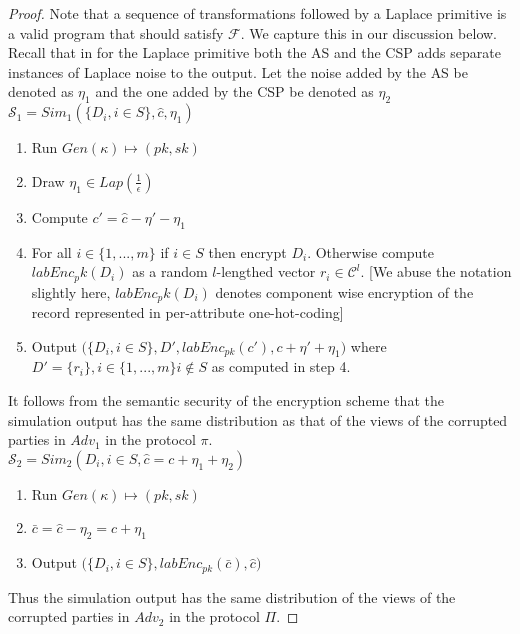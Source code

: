 \begin{proof}
  Note that a sequence of transformations followed by a \textsf{Laplace} primitive is a valid \system program that should satisfy $\mathcal{F}$. We capture this in our discussion below. Recall that in \system for the \textsf{Laplace} primitive both the \textsf{AS} and the \textsf{CSP} adds separate instances of Laplace noise to the output. Let the noise added by the \textsf{AS}  be denoted as $\eta_1$ and the one added by the \textsf{CSP} be denoted as $\eta_2$\\
$\mathcal{S}_1=Sim_1(\{D_i, i \in S\}, \hat{c}, \eta_1)$
\begin{enumerate}\item Run $Gen(\kappa)\mapsto (pk,sk)$ 
\item Draw $\eta_1 \in Lap(\frac{1}{\epsilon})$
\item Compute $c'=\hat{c}-\eta'-\eta_1$
\item For all $i \in \{1,...,m\}$ if $i \in S$ then encrypt $D_i$. 
Otherwise compute $labEnc_pk(D_i)$ as a random $l$-lengthed vector $r_i \in \mathcal{C}^l$. [We abuse the notation slightly here, $labEnc_pk(D_i)$ denotes component wise encryption of the record represented in per-attribute one-hot-coding]
\item Output $\Big(\{D_i, i \in S\},D',labEnc_{pk}(c'),c+\eta'+\eta_1 \Big)$ where $D'=\{r_i\},i \in \{1,...,m\} i \not \in S$ as computed in step 4.
\end{enumerate}
It follows from the semantic security of the encryption scheme that the simulation
output has the same distribution as that of the views of the corrupted parties in $Adv_1$ in the
protocol $\pi$.\\
$\mathcal{S}_2=Sim_2(D_i, i \in S, \hat{c}=c+\eta_1+\eta_2)$
\begin{enumerate}\item Run $Gen(\kappa)\mapsto (pk,sk)$ \item $\bar{c}=\hat{c}-\eta_2=c+\eta_1$
\item Output $\Big(\{D_i, i \in S\},labEnc_{pk}(\bar{c}),\hat{c} \Big)$
\end{enumerate}
Thus the simulation output has the same distribution of the
views of the corrupted parties in $Adv_2$ in the protocol $\Pi$. 


\end{proof}
